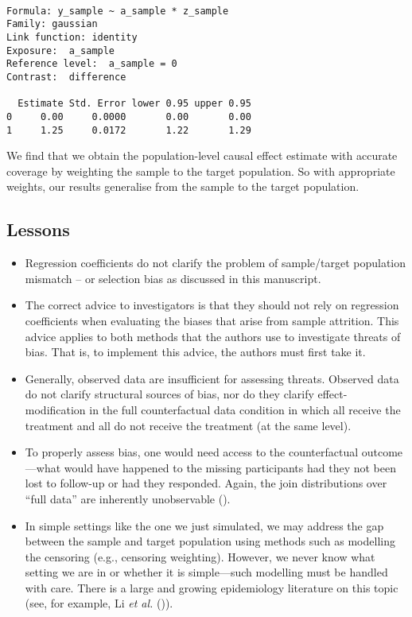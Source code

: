 \documentclass[
  single column]{article}
\providecommand{\tightlist}{%
  \setlength{\itemsep}{0pt}\setlength{\parskip}{0pt}}\usepackage{longtable,booktabs,array}
\begin{document}
\begin{verbatim}

Formula: y_sample ~ a_sample * z_sample
Family: gaussian 
Link function: identity 
Exposure:  a_sample 
Reference level:  a_sample = 0 
Contrast:  difference 

  Estimate Std. Error lower 0.95 upper 0.95
0     0.00     0.0000       0.00       0.00
1     1.25     0.0172       1.22       1.29
\end{verbatim}

We find that we obtain the population-level causal effect estimate with
accurate coverage by weighting the sample to the target population. So
with appropriate weights, our results generalise from the sample to the
target population.

\subsection{Lessons}\label{lessons}

\begin{itemize}
\tightlist
\item
  Regression coefficients do not clarify the problem of sample/target
  population mismatch -- or selection bias as discussed in this
  manuscript.
\item
  The correct advice to investigators is that they should not rely on
  regression coefficients when evaluating the biases that arise from
  sample attrition. This advice applies to both methods that the authors
  use to investigate threats of bias. That is, to implement this advice,
  the authors must first take it.
\item
  Generally, observed data are insufficient for assessing threats.
  Observed data do not clarify structural sources of bias, nor do they
  clarify effect-modification in the full counterfactual data condition
  in which all receive the treatment and all do not receive the
  treatment (at the same level).
\item
  To properly assess bias, one would need access to the counterfactual
  outcome---what would have happened to the missing participants had
  they not been lost to follow-up or had they responded. Again, the join
  distributions over ``full data'' are inherently unobservable
  ().
\item
  In simple settings like the one we just simulated, we may address the
  gap between the sample and target population using methods such as
  modelling the censoring (e.g., censoring weighting). However, we never
  know what setting we are in or whether it is simple---such modelling
  must be handled with care. There is a large and growing epidemiology
  literature on this topic (see, for example, Li \emph{et al.}
  ()).
\end{itemize}
\end{document}
